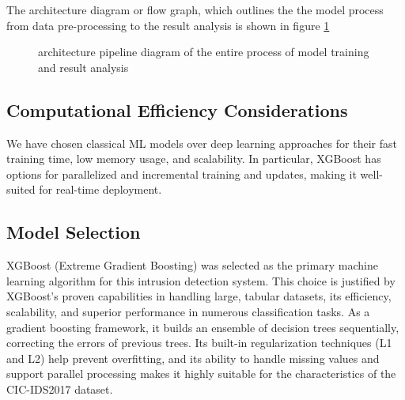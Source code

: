 The architecture diagram or flow graph, which outlines the the model process from data pre-processing to the result analysis is shown in figure \ref{fig:workflow_pipeline}

\begin{figure}[H]
	\caption{architecture pipeline diagram of the entire process of model training and result analysis}
	\label{fig:workflow_pipeline}
\end{figure}

\subsection{Computational Efficiency Considerations} 
We have chosen classical ML models over deep learning approaches for their fast training time, low memory usage, and scalability. In particular, XGBoost has options for parallelized and incremental training and updates, making it well-suited for real-time deployment.

\subsection{Model Selection}
XGBoost (Extreme Gradient Boosting) was selected as the primary machine learning algorithm for this intrusion detection system. This choice is justified by XGBoost's proven capabilities in handling large, tabular datasets, its efficiency, scalability, and superior performance in numerous classification tasks. As a gradient boosting framework, it builds an ensemble of decision trees sequentially, correcting the errors of previous trees. Its built-in regularization techniques (L1 and L2) help prevent overfitting, and its ability to handle missing values and support parallel processing makes it highly suitable for the characteristics of the CIC-IDS2017 dataset.

